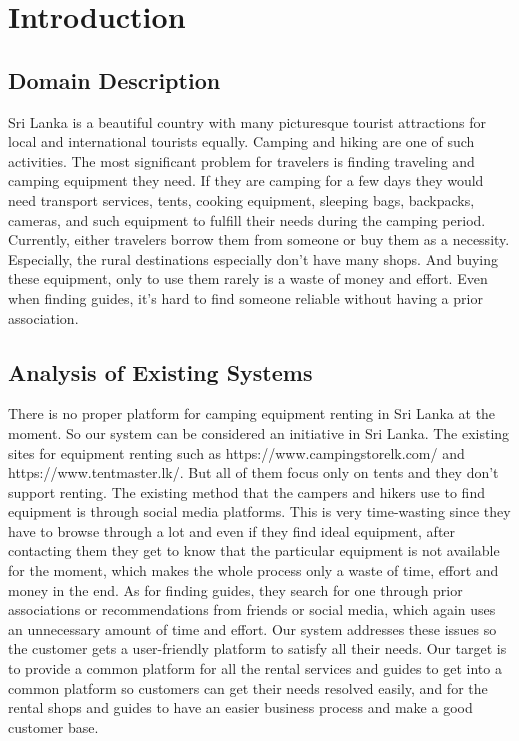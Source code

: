 \section{Introduction}

\subsection{Domain Description}
Sri Lanka is a beautiful country with many picturesque tourist attractions for local and international tourists equally. Camping and hiking are one of such activities. The most significant problem for travelers is finding traveling and camping equipment they need. If they are camping for a few days they would need transport services, tents, cooking equipment, sleeping bags, backpacks, cameras, and such equipment to fulfill their needs during the camping period. Currently, either travelers borrow them from someone or buy them as a necessity. Especially, the rural destinations especially don't have many shops. And buying these equipment, only to use them rarely is a waste of money and effort. Even when finding guides, it’s hard to find someone reliable without having a prior association.


\subsection{Analysis of Existing Systems}
There is no proper platform for camping equipment renting in Sri Lanka at the moment. So our system can be considered an initiative in Sri Lanka.
The existing sites for equipment renting such as https://www.campingstorelk.com/ and https://www.tentmaster.lk/. But all of them focus only on tents and they don't support renting. The existing method that the campers and hikers use to find equipment is through social media platforms. This is very time-wasting since they have to browse through a lot and even if they find ideal equipment, after contacting them they get to know that the particular equipment is not available for the moment, which makes the whole process only a waste of time, effort and money in the end. As for finding guides, they search for one through prior associations or recommendations from friends or social media, which again uses an unnecessary amount of time and effort.
Our system addresses these issues so the customer gets a user-friendly platform to satisfy all their needs. Our target is to provide a common platform for all the rental services and guides to get into a common platform so customers can get their needs resolved easily, and for the rental shops and guides to have an easier business process and make a good customer base. 



